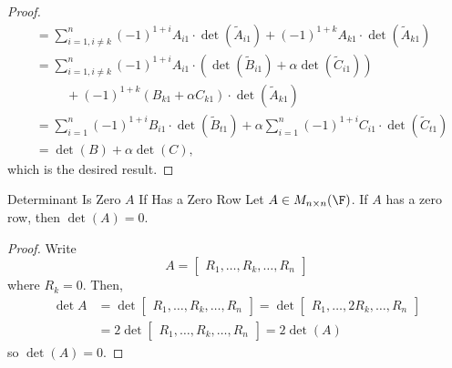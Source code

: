 \documentclass[linearalgebraI]{subfiles}
\begin{document}
\begin{proof}
\begin{align*}
                     & = \sum^n_{i=1, i\neq k} (-1)^{1+i} A_{i1} \cdot \det \left(\widetilde{A}_{i1}\right) + (-1)^{1+k} A_{k1} \cdot \det \left(\widetilde{A}_{k1}\right) \\
                     & = \sum^n_{i=1, i\neq k} (-1)^{1+i} A_{i1} \cdot \left( \det \left(\widetilde{B}_{i1}\right) + \alpha \det \left(\widetilde{C}_{i1}\right) \right) \\
                     & \hspace{1cm} + (-1)^{1+k} \left(B_{k1} + \alpha C_{k1}\right) \cdot \det \left(\widetilde{A}_{k1}\right) \\
                     & = \sum^n_{i=1} (-1)^{1+i} B_{i1} \cdot \det \left(\widetilde{B}_{t1}\right) + \alpha \sum^n_{i=1} (-1)^{1+i} C_{i1} \cdot \det \left(\widetilde{C}_{t1}\right) \\
                     & = \det (B) + \alpha \det (C),
        \end{align*}
        which is the desired result.
    \end{proof}

    \begin{cor}{Determinant Is Zero $A$ If Has a Zero Row}
        Let $A\in M_{n\times n}(\F)$. If $A$ has a zero row, then $\det(A) = 0$.
    \end{cor}	

    \begin{proof}
        Write
        \begin{equation*}
            A =
            \begin{bmatrix}
                R_1, \ldots, R_k, \ldots, R_n
            \end{bmatrix}
        \end{equation*}
        where $R_k = 0$. Then,
        \begin{align*}
            \det A 
            & = 
            \det 
            \begin{bmatrix}
                R_1, \ldots, R_k, \ldots, R_n
            \end{bmatrix}
            =
            \det
            \begin{bmatrix}
                R_1, \ldots, 2R_k, \ldots, R_n
            \end{bmatrix} \\
            & =
            2\det
            \begin{bmatrix}
                R_1, \ldots, R_k, \ldots, R_n
            \end{bmatrix}
            =2\det(A)
        \end{align*} 
        so $\det(A) = 0$.
    \end{proof}
\end{document}

